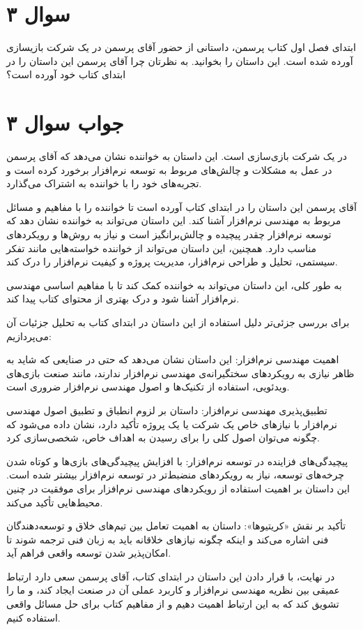 \section*{سوال ۳}

ابتدای فصل اول کتاب پرسمن، داستانی از حضور آقای پرسمن در یک شرکت بازیسازی آورده شده است. این داستان را بخوانید. به نظرتان چرا آقای پرسمن این داستان را در ابتدای کتاب خود آورده است؟

\section*{جواب سوال ۳}

در یک شرکت بازی‌سازی است. این داستان به خواننده نشان می‌دهد که آقای پرسمن در عمل به مشکلات و چالش‌های مربوط به توسعه نرم‌افزار برخورد کرده است و تجربه‌های خود را با خواننده به اشتراک می‌گذارد.

آقای پرسمن این داستان را در ابتدای کتاب آورده است تا خواننده را با مفاهیم و مسائل مربوط به مهندسی نرم‌افزار آشنا کند. این داستان می‌تواند به خواننده نشان دهد که توسعه نرم‌افزار چقدر پیچیده و چالش‌برانگیز است و نیاز به روش‌ها و رویکردهای مناسب دارد. همچنین، این داستان می‌تواند از خواننده خواسته‌هایی مانند تفکر سیستمی، تحلیل و طراحی نرم‌افزار، مدیریت پروژه و کیفیت نرم‌افزار را درک کند.

به طور کلی، این داستان می‌تواند به خواننده کمک کند تا با مفاهیم اساسی مهندسی نرم‌افزار آشنا شود و درک بهتری از محتوای کتاب پیدا کند.

برای بررسی جزئی‌تر دلیل استفاده از این داستان در ابتدای کتاب به تحلیل جزئیات آن می‌پردازیم:

اهمیت مهندسی نرم‌افزار: این داستان نشان می‌دهد که حتی در صنایعی که شاید به ظاهر نیازی به رویکردهای سختگیرانه‌ی مهندسی نرم‌افزار ندارند، مانند صنعت بازی‌های ویدئویی، استفاده از تکنیک‌ها و اصول مهندسی نرم‌افزار ضروری است.

تطبیق‌پذیری مهندسی نرم‌افزار: داستان بر لزوم انطباق و تطبیق اصول مهندسی نرم‌افزار با نیازهای خاص یک شرکت یا یک پروژه تأکید دارد، نشان داده می‌شود که چگونه می‌توان اصول کلی را برای رسیدن به اهداف خاص، شخصی‌سازی کرد.

پیچیدگی‌های فزاینده در توسعه نرم‌افزار: با افزایش پیچیدگی‌های بازی‌ها و کوتاه‌ شدن چرخه‌های توسعه، نیاز به رویکردهای منضبط‌تر در توسعه نرم‌افزار بیشتر شده است. این داستان بر اهمیت استفاده از رویکردهای مهندسی نرم‌افزار برای موفقیت در چنین محیط‌هایی تأکید می‌کند.

تأکید بر نقش «کریتیوها»: داستان به اهمیت تعامل بین تیم‌های خلاق و توسعه‌دهندگان فنی اشاره می‌کند و اینکه چگونه نیازهای خلاقانه باید به زبان فنی ترجمه شوند تا امکان‌پذیر شدن توسعه واقعی فراهم آید.

در نهایت، با قرار دادن این داستان در ابتدای کتاب، آقای پرسمن سعی دارد ارتباط عمیقی بین نظریه مهندسی نرم‌افزار و کاربرد عملی آن در صنعت ایجاد کند، و ما را تشویق کند که به این ارتباط اهمیت دهیم و از مفاهیم کتاب برای حل مسائل واقعی استفاده کنیم.